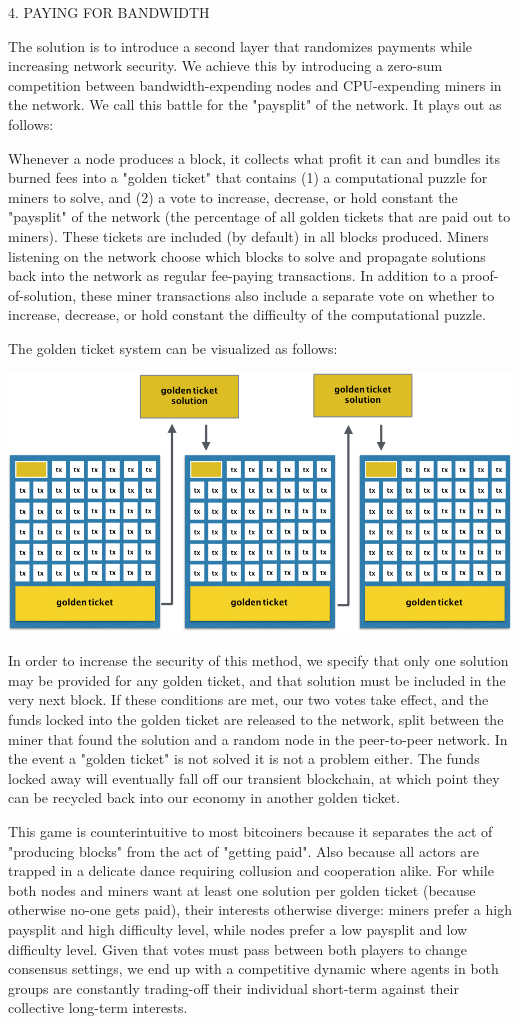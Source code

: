 \documentclass[11.5pt, oneside]{article}   	%
\begin{document}
\begin{multicols}{2}
4. PAYING FOR BANDWIDTH

The solution is to introduce a second layer that randomizes payments while increasing network security. We achieve this by introducing a zero-sum competition between bandwidth-expending nodes and CPU-expending miners in the network. We call this battle for the "paysplit" of the network. It plays out as follows:

Whenever a node produces a block, it collects what profit it can and bundles its burned fees into a "golden ticket" that contains (1) a computational puzzle for miners to solve, and (2) a vote to increase, decrease, or hold constant the "paysplit" of the network (the percentage of all golden tickets that are paid out to miners). These tickets are included (by default) in all blocks produced. Miners listening on the network choose which blocks to solve and propagate solutions back into the network as regular fee-paying transactions. In addition to a proof-of-solution, these miner transactions also include a separate vote on whether to increase, decrease, or hold constant the difficulty of the computational puzzle.

The golden ticket system can be visualized as follows:

\includegraphics[width=.45\textwidth]{saito7.jpeg}

In order to increase the security of this method, we specify that only one solution may be provided for any golden ticket, and that solution must be included in the very next block. If these conditions are met, our two votes take effect, and the funds locked into the golden ticket are released to the network, split between the miner that found the solution and a random node in the peer-to-peer network. In the event a "golden ticket" is not solved it is not a problem either. The funds locked away will eventually fall off our transient blockchain, at which point they can be recycled back into our economy in another golden ticket.

This game is counterintuitive to most bitcoiners because it separates the act of "producing blocks" from the act of "getting paid". Also because all actors are trapped in a delicate dance requiring collusion and cooperation alike. For while both nodes and miners want at least one solution per golden ticket (because otherwise no-one gets paid), their interests otherwise diverge: miners prefer a high paysplit and high difficulty level, while nodes prefer a low paysplit and low difficulty level. Given that votes must pass between both players to change consensus settings, we end up with a competitive dynamic where agents in both groups are constantly trading-off their individual short-term against their collective long-term interests.


\end{multicols}
\end{document}
